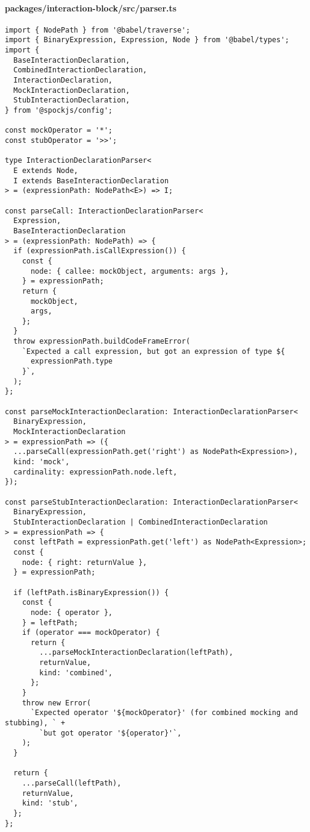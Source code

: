 \paragraph*{packages/interaction-block/src/parser.ts}
\begin{verbatim}
import { NodePath } from '@babel/traverse';
import { BinaryExpression, Expression, Node } from '@babel/types';
import {
  BaseInteractionDeclaration,
  CombinedInteractionDeclaration,
  InteractionDeclaration,
  MockInteractionDeclaration,
  StubInteractionDeclaration,
} from '@spockjs/config';

const mockOperator = '*';
const stubOperator = '>>';

type InteractionDeclarationParser<
  E extends Node,
  I extends BaseInteractionDeclaration
> = (expressionPath: NodePath<E>) => I;

const parseCall: InteractionDeclarationParser<
  Expression,
  BaseInteractionDeclaration
> = (expressionPath: NodePath) => {
  if (expressionPath.isCallExpression()) {
    const {
      node: { callee: mockObject, arguments: args },
    } = expressionPath;
    return {
      mockObject,
      args,
    };
  }
  throw expressionPath.buildCodeFrameError(
    `Expected a call expression, but got an expression of type ${
      expressionPath.type
    }`,
  );
};

const parseMockInteractionDeclaration: InteractionDeclarationParser<
  BinaryExpression,
  MockInteractionDeclaration
> = expressionPath => ({
  ...parseCall(expressionPath.get('right') as NodePath<Expression>),
  kind: 'mock',
  cardinality: expressionPath.node.left,
});

const parseStubInteractionDeclaration: InteractionDeclarationParser<
  BinaryExpression,
  StubInteractionDeclaration | CombinedInteractionDeclaration
> = expressionPath => {
  const leftPath = expressionPath.get('left') as NodePath<Expression>;
  const {
    node: { right: returnValue },
  } = expressionPath;

  if (leftPath.isBinaryExpression()) {
    const {
      node: { operator },
    } = leftPath;
    if (operator === mockOperator) {
      return {
        ...parseMockInteractionDeclaration(leftPath),
        returnValue,
        kind: 'combined',
      };
    }
    throw new Error(
      `Expected operator '${mockOperator}' (for combined mocking and stubbing), ` +
        `but got operator '${operator}'`,
    );
  }

  return {
    ...parseCall(leftPath),
    returnValue,
    kind: 'stub',
  };
};


\end{verbatim}
